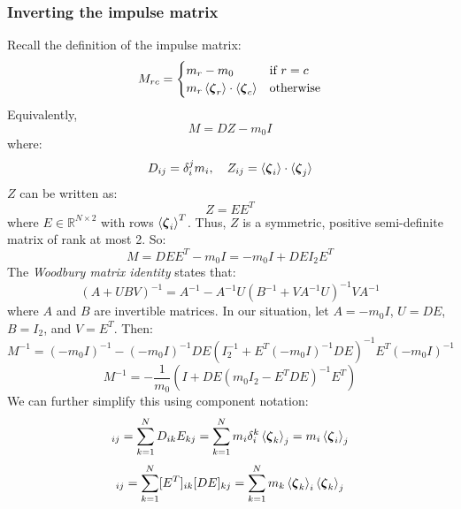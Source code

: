 \documentclass[10pt]{report}
\begin{document}
\subsubsection{Inverting the impulse matrix}
Recall the definition of the impulse matrix:
\begin{equation}M_{rc}=\begin{cases}m_r-m_0&\mbox{if }r=c\\m_r\braket{\boldsymbol{\zeta}_r}\cdot\braket{\boldsymbol{\zeta}_c}&\mbox{otherwise}\end{cases}\end{equation}
Equivalently,
\begin{equation}M=DZ-m_0I\end{equation}
where:
\begin{equation}D_{ij}=\delta_i^jm_i,\quad Z_{ij}=\braket{\boldsymbol{\zeta}_i}\cdot\braket{\boldsymbol{\zeta}_j}\end{equation}
$Z$ can be written as:
\begin{equation}Z=EE^T\end{equation}
where $E\in\mathbb{R}^{N\times2}$ with rows $\braket{\boldsymbol{\zeta}_i}^T$. Thus, $Z$ is a symmetric, positive semi-definite matrix of rank at most 2. So:
\begin{equation}M=DEE^T-m_0I=-m_0I+DEI_2E^T\end{equation}
The \textit{Woodbury matrix identity} states that:
\begin{equation}(A+UBV)^{-1}=A^{-1}-A^{-1}U(B^{-1}+VA^{-1}U)^{-1}VA^{-1}\end{equation}
where $A$ and $B$ are invertible matrices. In our situation, let $A=-m_0I$, $U=DE$, $B=I_2$, and $V=E^T$. Then:
\begin{equation}M^{-1}=(-m_0I)^{-1}-(-m_0I)^{-1}DE(I_2^{-1}+E^T(-m_0I)^{-1}DE)^{-1}E^T(-m_0I)^{-1}\end{equation}
\begin{equation}M^{-1}=-\frac{1}{m_0}\left(I+DE(m_0I_2-E^TDE)^{-1}E^T\right)\end{equation}
We can further simplify this using component notation:
\begin{equation}[DE]_{ij}=\sum_{k=1}^ND_{ik}E_{kj}=\sum_{k=1}^Nm_i\delta_i^k\braket{\boldsymbol{\zeta}_k}_j=m_i\braket{\boldsymbol{\zeta}_i}_j\end{equation}
\begin{equation}[E^TDE]_{ij}=\sum_{k=1}^N[E^T]_{ik}[DE]_{kj}=\sum_{k=1}^Nm_k\braket{\boldsymbol{\zeta}_k}_i\braket{\boldsymbol{\zeta}_k}_j\end{equation}
\end{document}
